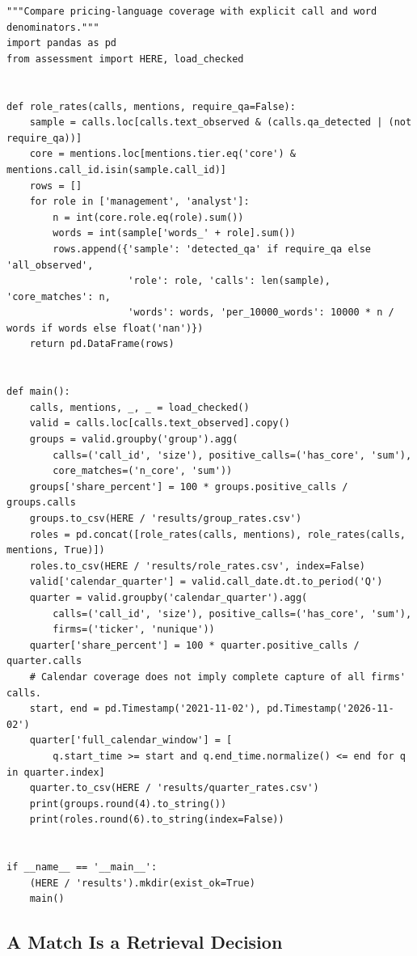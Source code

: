 \begin{Verbatim}[breaklines,breakanywhere,fontsize=\small]
"""Compare pricing-language coverage with explicit call and word denominators."""
import pandas as pd
from assessment import HERE, load_checked


def role_rates(calls, mentions, require_qa=False):
    sample = calls.loc[calls.text_observed & (calls.qa_detected | (not require_qa))]
    core = mentions.loc[mentions.tier.eq('core') & mentions.call_id.isin(sample.call_id)]
    rows = []
    for role in ['management', 'analyst']:
        n = int(core.role.eq(role).sum())
        words = int(sample['words_' + role].sum())
        rows.append({'sample': 'detected_qa' if require_qa else 'all_observed',
                     'role': role, 'calls': len(sample), 'core_matches': n,
                     'words': words, 'per_10000_words': 10000 * n / words if words else float('nan')})
    return pd.DataFrame(rows)


def main():
    calls, mentions, _, _ = load_checked()
    valid = calls.loc[calls.text_observed].copy()
    groups = valid.groupby('group').agg(
        calls=('call_id', 'size'), positive_calls=('has_core', 'sum'),
        core_matches=('n_core', 'sum'))
    groups['share_percent'] = 100 * groups.positive_calls / groups.calls
    groups.to_csv(HERE / 'results/group_rates.csv')
    roles = pd.concat([role_rates(calls, mentions), role_rates(calls, mentions, True)])
    roles.to_csv(HERE / 'results/role_rates.csv', index=False)
    valid['calendar_quarter'] = valid.call_date.dt.to_period('Q')
    quarter = valid.groupby('calendar_quarter').agg(
        calls=('call_id', 'size'), positive_calls=('has_core', 'sum'),
        firms=('ticker', 'nunique'))
    quarter['share_percent'] = 100 * quarter.positive_calls / quarter.calls
    # Calendar coverage does not imply complete capture of all firms' calls.
    start, end = pd.Timestamp('2021-11-02'), pd.Timestamp('2026-11-02')
    quarter['full_calendar_window'] = [
        q.start_time >= start and q.end_time.normalize() <= end for q in quarter.index]
    quarter.to_csv(HERE / 'results/quarter_rates.csv')
    print(groups.round(4).to_string())
    print(roles.round(6).to_string(index=False))


if __name__ == '__main__':
    (HERE / 'results').mkdir(exist_ok=True)
    main()
\end{Verbatim}

\hypertarget{M05-a-match-is-a-retrieval-decision}{%
\subsection{A Match Is a Retrieval
Decision}\label{M05-a-match-is-a-retrieval-decision}}

